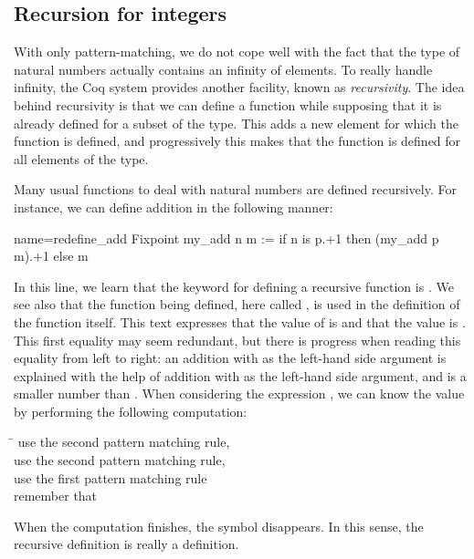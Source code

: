 \subsection{Recursion for integers}
With only pattern-matching, we do not cope well with the fact that the
type  of natural numbers actually contains an infinity of
elements.  To really handle infinity, the Coq system provides another
facility, known as {\em recursivity}.  The idea behind recursivity is
that we can define a function while supposing that it is already
defined for a subset of the type.  This adds a new element for which
the function is defined, and progressively this makes that the
function is defined for all elements of the type.

Many usual functions to deal with natural numbers are
defined recursively.  For instance, we can define addition in the
following manner:

\begin{coq}{name=redefine_add}{}
Fixpoint my_add n m :=
  if n is p.+1 then (my_add p m).+1 else m
\end{coq}
In this line, we learn that the keyword for defining a recursive
function is .  We see also that the function being
defined, here called , is used in the definition of the
function  itself.  This text expresses that the value of
 is
 and that the value  is .
This first equality may
seem redundant, but there is progress when reading this equality from
left to right: an addition with  as the left-hand side argument
is explained with the help of addition with  as the left-hand side
argument, and  is a smaller number than .  When considering the
expression , we can know the value by performing the following
computation:
\begin{tabbing}
\=\kill
{} \> use the second pattern matching rule, \\
 \> use the second pattern matching rule, \\
 \> use the first pattern matching rule\\
\> remember that \\
\end{tabbing}
When the computation finishes, the symbol  disappears.  In
this sense, the recursive definition is really a definition.

